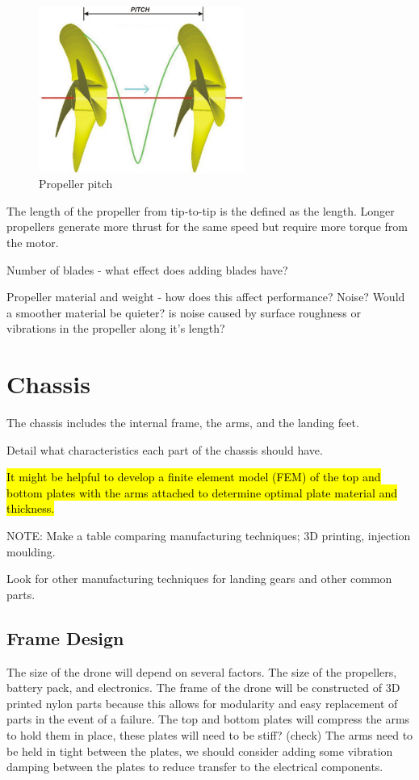 \begin{figure}[!htb]
	\graphicspath{ {Images/} }
	\centering
	\includegraphics[width=0.6\textwidth,scale=0.8]{propeller.jpg}
	\caption{Propeller pitch }
	\label{fig:propeller}
\end{figure}

The length of the propeller from tip-to-tip is the defined as the length. Longer propellers generate more thrust for the same speed but require more torque from the motor. 

Number of blades - what effect does adding blades have?

Propeller material and weight - how does this affect performance? Noise? Would a smoother material be quieter? is noise caused by surface roughness or vibrations in the propeller along it's length?

\section{Chassis}
The chassis includes the internal frame, the arms, and the landing feet. 

Detail what characteristics each part of the chassis should have.

\hl{It might be helpful to develop a finite element model (FEM) of the top and bottom plates with the arms attached to determine optimal plate material and thickness.}

NOTE: Make a table comparing manufacturing techniques; 3D printing, injection moulding.

Look for other manufacturing techniques for landing gears and other common parts.

\subsection{Frame Design}
The size of the drone will depend on several factors. The size of the propellers, battery pack, and electronics. 
The frame of the drone will be constructed of 3D printed nylon parts because this allows for modularity and easy replacement of parts in the event of a failure. 
The top and bottom plates will compress the arms to hold them in place,  these plates will need to be stiff? (check) The arms need to be held in tight between the plates, we should consider adding some vibration damping between the plates to reduce transfer to the electrical components.


